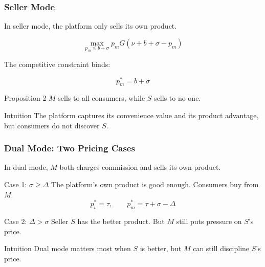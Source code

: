 \documentclass[aspectratio=169,AutoFakeBold,AutoFakeSlant]{beamer}
\begin{document}
\begin{frame}
  \frametitle{Seller Mode}
  \small
  In seller mode, the platform only sells its own product.

  \begin{equation*}
    \max_{p_m\leq b+\sigma} p_m G(\nu+b+\sigma-p_m)
  \end{equation*}

  The competitive constraint binds:

  \begin{equation*}
    p_m^*=b+\sigma
  \end{equation*}

  \begin{block}{Proposition 2}
    $M$ sells to all consumers, while $S$ sells to no one.
  \end{block}

  \begin{alertblock}{Intuition}
    The platform captures its convenience value and its product advantage, but consumers do not discover $S$.
  \end{alertblock}
\end{frame}

\begin{frame}
  \frametitle{Dual Mode: Two Pricing Cases}
  \small
  In dual mode, $M$ both charges commission and sells its own product.

  \begin{block}{Case 1: $\sigma \geq \Delta$}
    The platform's own product is good enough. Consumers buy from $M$.
    \[
      p_i^*=\tau, \qquad p_m^*=\tau+\sigma-\Delta
    \]
  \end{block}

  \begin{block}{Case 2: $\Delta>\sigma$}
    Seller $S$ has the better product. But $M$ still puts pressure on $S$'s price.
  \end{block}

  \begin{alertblock}{Intuition}
    Dual mode matters most when $S$ is better, but $M$ can still discipline $S$'s price.
  \end{alertblock}
\end{frame}
\end{document}
